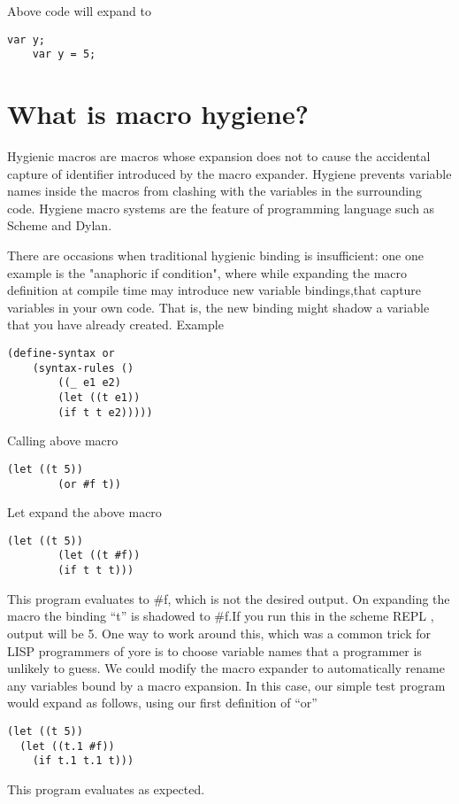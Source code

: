 Above code will expand to
\begin{lstlisting}[frame=single]
	var y;
	var y = 5;
\end{lstlisting}

\section{What is macro hygiene?}

Hygienic macros are macros whose expansion does not to cause the accidental capture of identifier introduced by the macro expander. Hygiene prevents variable names inside the macros from clashing with the variables in the surrounding code. Hygiene macro systems are the feature of programming language such as Scheme and Dylan. 

There are occasions when traditional hygienic binding is insufficient: one one example is the "anaphoric if condition",
where while expanding the macro definition at compile time may introduce new variable bindings,that capture variables in your own code. That is, the new binding might shadow a variable that you have already created. Example

\begin{lstlisting}[frame=single]
	(define-syntax or
  	(syntax-rules ()
    	((_ e1 e2)
     	(let ((t e1))
       	(if t t e2)))))
\end{lstlisting}

Calling above macro 
\begin{lstlisting}[frame=single]
 	(let ((t 5))
  		(or #f t))
\end{lstlisting} 
  Let expand the above macro

\begin{lstlisting}[frame=single]
  	(let ((t 5))
  		(let ((t #f))
    	(if t t t)))
\end{lstlisting} 
 This program evaluates to \#f, which is not the desired output. On expanding the macro the binding ``t'' is shadowed to \#f.If you run this in the scheme REPL , output will be 5. One way to work around this, which was a common trick for LISP programmers of yore is to choose variable names that a programmer is unlikely to guess. We could modify the macro expander to automatically rename any variables bound by a macro expansion. In this case, our simple test program would expand as follows, using our first definition of ``or''
\newpage
\begin{lstlisting}[frame=single] 
 (let ((t 5))
  (let ((t.1 #f))
    (if t.1 t.1 t)))
 \end{lstlisting}   
This program evaluates as expected.

